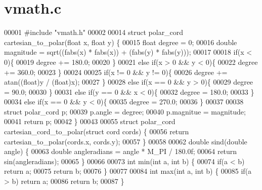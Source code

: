 \section{vmath.\+c}
\label{vmath_8c_source}

\begin{DoxyCode}
00001 \textcolor{preprocessor}{#include "vmath.h"}
00002 
00014 \textcolor{keyword}{struct }polar_cord cartesian_to_polar(float x, float y) \{
00015   \textcolor{keywordtype}{float} degree = 0;
00016   \textcolor{keywordtype}{double} magnitude = sqrt((fabs(x) * fabs(x)) + (fabs(y) * fabs(y)));
00017 
00018   \textcolor{keywordflow}{if}(x < 0)\{
00019     degree += 180.0;
00020   \}
00021   \textcolor{keywordflow}{else} \textcolor{keywordflow}{if}(x > 0 && y < 0)\{
00022     degree += 360.0;
00023   \}
00024 
00025   \textcolor{keywordflow}{if}(x != 0 && y != 0)\{
00026     degree += atan((\textcolor{keywordtype}{float})y / (\textcolor{keywordtype}{float})x);
00027   \}
00028   \textcolor{keywordflow}{else} \textcolor{keywordflow}{if}(x == 0 && y > 0)\{
00029     degree = 90.0;
00030   \}
00031   \textcolor{keywordflow}{else} \textcolor{keywordflow}{if}(y == 0 && x < 0)\{
00032     degree = 180.0;
00033   \}
00034   \textcolor{keywordflow}{else} \textcolor{keywordflow}{if}(x == 0 && y < 0)\{
00035     degree = 270.0;
00036   \}
00037 
00038   \textcolor{keyword}{struct }polar_cord p;
00039   p.angle = degree;
00040   p.magnitue = magnitude;
00041   \textcolor{keywordflow}{return} p;
00042 \}
00043 
00055 \textcolor{keyword}{struct }polar_cord cartesian_cord_to_polar(struct cord cords) \{
00056   \textcolor{keywordflow}{return} cartesian_to_polar(cords.x, cords.y);
00057 \}
00058 
00062 \textcolor{keywordtype}{double} sind(\textcolor{keywordtype}{double} angle) \{
00063     \textcolor{keywordtype}{double} angleradians = angle * M_PI / 180.0f;
00064     \textcolor{keywordflow}{return} sin(angleradians);
00065 \}
00066 
00073 \textcolor{keywordtype}{int} min(\textcolor{keywordtype}{int} a, \textcolor{keywordtype}{int} b) \{
00074   \textcolor{keywordflow}{if}(a < b) \textcolor{keywordflow}{return} a;
00075   \textcolor{keywordflow}{return} b;
00076 \}
00077 
00084 \textcolor{keywordtype}{int} max(\textcolor{keywordtype}{int} a, \textcolor{keywordtype}{int} b) \{
00085   \textcolor{keywordflow}{if}(a > b) \textcolor{keywordflow}{return} a;
00086   \textcolor{keywordflow}{return} b;
00087 \}
\end{DoxyCode}
